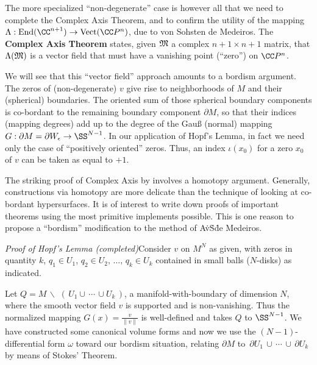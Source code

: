 The more specialized ``non-degenerate'' case is however all that we need to complete the Complex Axis Theorem, and to confirm the utility of the mapping $\Lambda: \text{End}(\CC^{n+1}) \to \text{Vect}(\CC P^n)$, due to von Sohsten de Medeiros. The {\bf Complex Axis Theorem} states, given $\frak M$ a complex $n+1 \times n+1$ matrix, that $\Lambda (\frak M)$ is a vector field that must have a vanishing point (``zero'') on $\CC P^n$.

We will see that this ``vector field'' approach amounts to a bordism argument. The zeros of (non-degenerate) $v$ give rise to neighborhoods of $M$ and their (spherical) boundaries. The oriented sum of those spherical boundary components is co-bordant to the remaining boundary component $\partial M$, so that their indices (mapping degrees) add up to the degree of the Gau{\ss} (normal) mapping $G: \partial M = \partial W_{\epsilon} \to \SS^{N - 1}$.
In our application of Hopf's Lemma, in fact we need only the case of ``positively oriented'' zeros. Thus, an index $\iota (x_0)$ for a zero $x_0$ of $v$ can be taken  as equal to $+1$.

The striking proof of Complex Axis by \cite{de Medeiros} involves a homotopy argument. Generally, constructions via homotopy are more delicate than the technique of looking at co-bordant hypersurfaces. It is of interest to write down proofs of important theorems using the most primitive implements possible. This is one reason to propose a ``bordism'' modification to the method of A\. v\. S\. de Medeiros.

\bigskip
\noindent
{\it Proof of Hopf's Lemma (completed)}\quad Consider $v$ on $M^N$ as given, with zeros in quantity $k$, $q_1 \in U_1$, $q_2 \in U_2,\,\dotsc,\, q_k \in U_k$ contained in small balls ($N$-disks) as indicated. 

\bigskip
Let $Q = M \, \backslash \,\, (\,U_1 \cup \,\cdots\, \cup U_k\,)$, a manifold-with-boundary of dimension $N$, where the smooth vector field $v$ is supported and is non-vanishing. Thus the normalized mapping $G(x) = \frac{v}{\|v\|}$ is well-defined and takes $Q$ to $\SS^{N - 1}$. We have constructed some canonical volume forms and now we use the $(N - 1)$-differential form $\omega$  toward our bordism situation, relating $\partial M$ to  $\,\partial U_1 \,\cup\, \cdots \,\cup\, \partial U_k$ by means of Stokes' Theorem.

